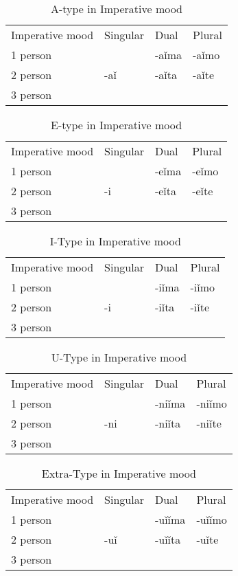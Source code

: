 
\begin{table}[!htpb]
	\caption{A-type in Imperative mood}
	\begin{tabular}{llll}
		Imperative mood & Singular & Dual & Plural \\
		1 person &  & -aǐma & -aǐmo \\
		2 person & -aǐ & -aǐta & -aǐte \\
		3 person &  &  & 
	\end{tabular}
\end{table}

\begin{table}[!htpb]
	\caption{E-type in Imperative mood}
	\begin{tabular}{llll}
		Imperative mood & Singular & Dual & Plural \\
		1 person &  & -eǐma & -eǐmo \\
		2 person & -i & -eǐta & -eǐte \\
		3 person &  &  & 
	\end{tabular}
\end{table}

\begin{table}[!htpb]
	\caption{I-Type in Imperative mood}
	\begin{tabular}{llll}
		Imperative mood & Singular & Dual & Plural \\
		1 person &  & -iǐma & -iǐmo \\
		2 person & -i & -iǐta & -iǐte \\
		3 person &  &  & 
	\end{tabular}
\end{table}

\begin{table}[!htpb]
	\caption{U-Type in Imperative mood}
	\begin{tabular}{llll}
		Imperative mood & Singular & Dual & Plural \\
		1 person &  & -niǐma & -niǐmo \\
		2 person & -ni & -niǐta & -niǐte \\
		3 person &  &  & 
	\end{tabular}
\end{table}


\begin{table}[!htpb]
	\caption{Extra-Type in Imperative mood}
	\begin{tabular}{llll}
		Imperative mood & Singular & Dual & Plural \\
		1 person &  & -uǐǐma & -uǐǐmo \\
		2 person & -uǐ & -uǐǐta & -uǐte \\
		3 person &  &  & 
	\end{tabular}
\end{table}
